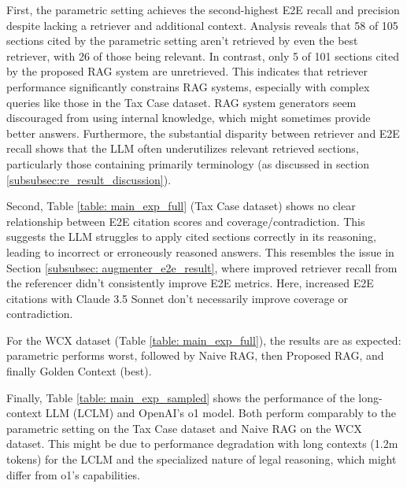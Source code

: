 First, the parametric setting achieves the second-highest E2E recall and precision despite lacking a retriever and additional context. Analysis reveals that 58 of 105 sections cited by the parametric setting aren't retrieved by even the best retriever, with 26 of those being relevant. In contrast, only 5 of 101 sections cited by the proposed RAG system are unretrieved. This indicates that retriever performance significantly constrains RAG systems, especially with complex queries like those in the Tax Case dataset. RAG system generators seem discouraged from using internal knowledge, which might sometimes provide better answers. Furthermore, the substantial disparity between retriever and E2E recall shows that the LLM often underutilizes relevant retrieved sections, particularly those containing primarily terminology (as discussed in section \ref{subsubsec:re_result_discussion}).

Second, Table \ref{table: main_exp_full} (Tax Case dataset) shows no clear relationship between E2E citation scores and coverage/contradiction. This suggests the LLM struggles to apply cited sections correctly in its reasoning, leading to incorrect or erroneously reasoned answers. This resembles the issue in Section \ref{subsubsec: augmenter_e2e_result}, where improved retriever recall from the referencer didn't consistently improve E2E metrics. Here, increased E2E citations with Claude 3.5 Sonnet don't necessarily improve coverage or contradiction.

For the WCX dataset (Table \ref{table: main_exp_full}), the results are as expected: parametric performs worst, followed by Naive RAG, then Proposed RAG, and finally Golden Context (best).

Finally, Table \ref{table: main_exp_sampled} shows the performance of the long-context LLM (LCLM) and OpenAI's o1 model. Both perform comparably to the parametric setting on the Tax Case dataset and Naive RAG on the WCX dataset. This might be due to performance degradation with long contexts (1.2m tokens) for the LCLM and the specialized nature of legal reasoning, which might differ from o1's capabilities.







